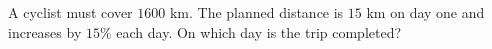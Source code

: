A cyclist must cover $ 1600 $ km. The planned distance is $ 15 $ km on day one and increases by $ 15\%$ each day. On which day is the trip completed?
